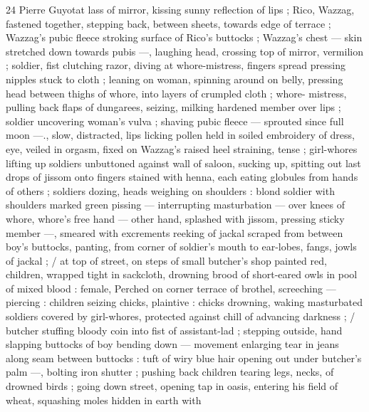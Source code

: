24 Pierre Guyotat
lass of mirror, kissing sunny reflection of lips ; Rico, Wazzag,
fastened together, stepping back, between sheets, towards edge of
terrace ; Wazzag's pubic fleece stroking surface of Rico's buttocks ;
Wazzag's chest — skin stretched down towards pubis —, laughing
head, crossing top of mirror, vermilion ; soldier, fist clutching razor,
diving at whore-mistress, fingers spread pressing nipples stuck to
cloth ; leaning on woman, spinning around on belly, pressing head
between thighs of whore, into layers of crumpled cloth ; whore-
mistress, pulling back flaps of dungarees, seizing, milking hardened
member over lips ; soldier uncovering woman's vulva ; shaving pubic
fleece — sprouted since full moon —., slow, distracted, lips licking
pollen held in soiled embroidery of dress, eye, veiled in orgasm,
fixed on Wazzag's raised heel straining, tense ; girl-whores lifting up
soldiers unbuttoned against wall of saloon, sucking up, spitting out
last drops of jissom onto fingers stained with henna, each eating
globules from hands of others ; soldiers dozing, heads weighing on
shoulders : blond soldier with shoulders marked green pissing —
interrupting masturbation — over knees of whore, whore’s free
hand — other hand, splashed with jissom, pressing sticky member
—, smeared with excrements reeking of jackal scraped from
between boy's buttocks, panting, from corner of soldier's mouth to
ear-lobes, fangs, jowls of jackal ; / at top of street, on steps of small
butcher's shop painted red, children, wrapped tight in sackcloth,
drowning brood of short-eared owls in pool of mixed blood : female,
Perched on corner terrace of brothel, screeching — piercing :
children seizing chicks, plaintive : chicks drowning, waking
masturbated soldiers covered by girl-whores, protected against chill
of advancing darkness ; / butcher stuffing bloody coin into fist of
assistant-lad ; stepping outside, hand slapping buttocks of boy
bending down — movement enlarging tear in jeans along seam
between buttocks : tuft of wiry blue hair opening out under butcher's
palm —, bolting iron shutter ; pushing back children tearing legs,
necks, of drowned birds ; going down street, opening tap in oasis,
entering his field of wheat, squashing moles hidden in earth with

